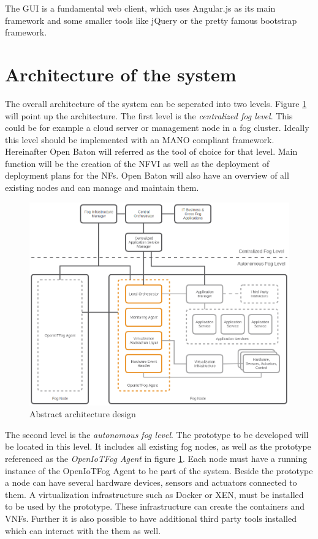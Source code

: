 The \ac{GUI} is a fundamental web client, which uses Angular.js as its main framework and some smaller tools like jQuery or the pretty famous bootstrap framework.

\section{Architecture of the system}
The overall architecture of the system can be seperated into two levels.
Figure \ref{fig:abstract_architecture_design} will point up the architecture.
The first level is the \textit{centralized fog level}.
This could be for example a cloud server or management node in a fog cluster.
Ideally this level should be implemented with an \ac{MANO} compliant framework.
Hereinafter Open Baton will referred as the tool of choice for that level.
Main function will be the creation of the \ac{NFVI} as well as the deployment of deployment plans for the \acp{NF}.
Open Baton will also have an overview of all existing nodes and can manage and maintain them.

\begin{figure}[H]
    \centering
    \includegraphics[width=\textwidth]{resources/images/initial_structure.png}
    \caption[Abstract architecture design]{Abstract architecture design}
    \label{fig:abstract_architecture_design}
\end{figure}

The second level is the \textit{autonomous fog level}.
The prototype to be developed will be located in this level.
It includes all existing fog nodes, as well as the prototype referenced as the \textit{OpenIoTFog Agent} in figure \ref{fig:abstract_architecture_design}.
Each node must have a running instance of the OpenIoTFog Agent to be part of the system.
Beside the prototype a node can have several hardware devices, sensors and actuators connected to them.
A virtualization infrastructure such as Docker or XEN, must be installed to be used by the prototype.
These infrastructure can create the containers and \acp{VNF}.
Further it is also possible to have additional third party tools installed which can interact with the them as well.

